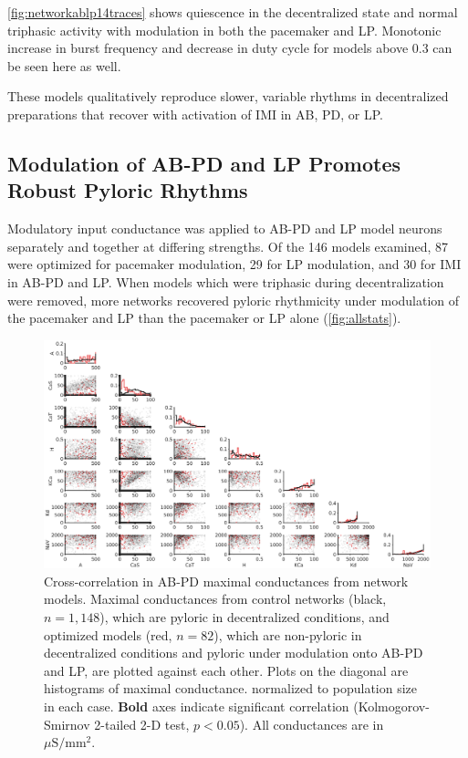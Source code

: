 \FloatBarrier

\autoref{fig:networkablp14traces} shows quiescence in the decentralized state and normal triphasic activity with modulation in both the pacemaker and \acs{LP}. Monotonic increase in burst frequency and decrease in duty cycle for models above 0.3 can be seen here as well.

These models qualitatively reproduce slower, variable rhythms in decentralized preparations that recover with activation of \acs{IMI} in \acs{AB}, \acs{PD}, or \acs{LP}.

\FloatBarrier

\subsection{Modulation of AB-PD and LP Promotes Robust Pyloric Rhythms}

Modulatory input conductance was applied to \acs{AB}-\acs{PD} and \acs{LP} model neurons separately and together at differing strengths. Of the 146 models examined, 87 were optimized for pacemaker modulation, 29 for \acs{LP} modulation, and 30 for \acs{IMI} in \acs{AB}-\acs{PD} and \acs{LP}. When models which were triphasic during decentralization were removed, more networks recovered pyloric rhythmicity under modulation of the pacemaker and \acs{LP} than the pacemaker or \acs{LP} alone (\autoref{fig:allstats}).



\begin{figure}
	\centering
	\includegraphics[width=1.3\linewidth]{gfx/all-modulation/correlations_AB}
	\caption[Cross-correlations in AB-PD model maximal conductances]{Cross-correlation in \acs{AB}-\acs{PD} maximal conductances from network models. Maximal conductances from control networks (black, $n=1,148$), which are pyloric in decentralized conditions, and optimized models (red, $n=82$), which are non-pyloric in decentralized conditions and pyloric under modulation onto \acs{AB}-\acs{PD} and \acs{LP}, are plotted against each other. Plots on the diagonal are histograms of maximal conductance. normalized to population size in each case. \textbf{Bold} axes indicate significant correlation (Kolmogorov-Smirnov 2-tailed 2-D test, $p<0.05$). All conductances are in $\mu\mathrm{S/mm^2}.$}  
	\label{fig:correlationsab}
\end{figure}

